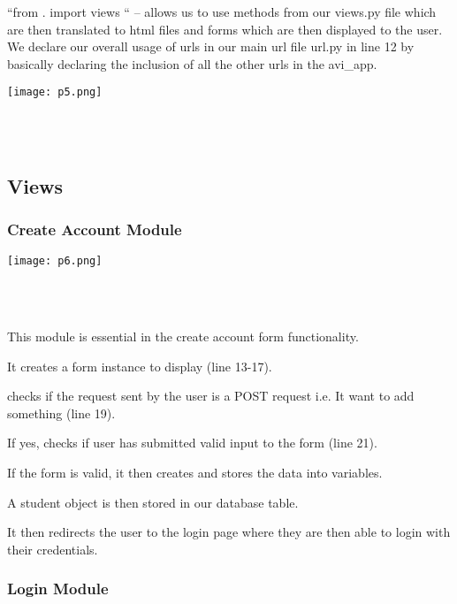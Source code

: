 \documentclass[10pt]{article}
\begin{document}
“from . import views “ – allows us to use methods from our views.py file which are then translated to html files and forms which are then displayed to the user. \\

We declare our overall usage of urls in our main url file url.py in line 12 by basically declaring the inclusion of all the other urls in the avi\_app.

\begin{center}
\texttt{[image: p5.png]}
\end{center} \\ \\

\subsection{Views}

\subsubsection{Create Account Module}

\begin{center}
\texttt{[image: p6.png]}
\end{center} \\ \\

\begin{description}[font=$\bullet$~\normalfont\scshape\color{red!50!black}]
\item [] This module is essential in the create account form functionality. 
\item [] It creates a form instance to display (line 13-17).
\item [] checks if the request sent by the user is a POST request i.e. It want to add something (line 19).
\item [] If yes, checks if user has submitted valid input to the form (line 21).
\item [] If the form is valid, it then creates and stores the data into variables.
\item [] A student object is then stored in our database table.
\item [] It then redirects the user to the login page where they are then able to login with their credentials.

\end{description}

\subsubsection{Login Module}
\end{document}
